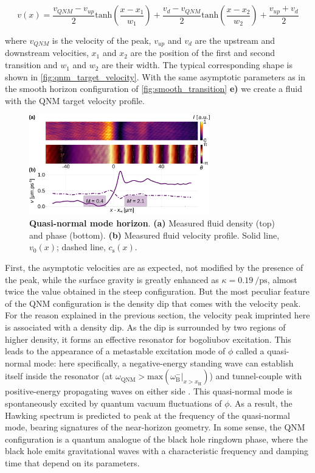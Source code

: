 \begin{equation}
    v(x)= \frac{v_{QNM}-v_{up}}{2}\mathrm{tanh}(\frac{x-x_1}{w_1})+ \frac{v_{d}-v_{QNM}}{2}\mathrm{tanh}(\frac{x-x_2}{w_2})+\frac{v_{up}+v_{d}}{2}
    \label{eq:target_velocity_qnm}
\end{equation}

where $v_{QNM}$ is the velocity of the peak, $v_{up}$ and $v_{d}$ are the upstream and downstream velocities, $x_1$ and $x_2$ are the position of the first and second transition and $w_1$ and $w_2$ are their width.
The typical corresponding shape is shown in \autoref{fig:qnm_target_velocity}.
With the same asymptotic parameters as in the smooth horizon configuration of \autoref{fig:smooth_transition} \textbf{e)} we create a fluid with the QNM target velocity profile.
\begin{figure}
    \centering
    \includegraphics[width=0.7\textwidth]{chap_custom_st/fig/bh_qnm.pdf}
    \caption{\textbf{Quasi-normal mode horizon}.    
    \textbf{(a)} Measured fluid density (top) and phase (bottom).
    \textbf{(b)} Measured fluid velocity profile.
    Solid line, $v_0(x)$; dashed line, $c_\mathrm{s}(x)$.}
    \label{fig:bh_qnm}
\end{figure}

First, the asymptotic velocities are as expected, not modified by the presence of the peak, while the surface gravity 
is greatly enhanced as $\kappa = \SI{0.19}{\per \pico \second}$, almost twice the value obtained in the steep configuration.
But the most peculiar feature of the QNM configuration is the density dip that comes with the velocity peak. For the reason explained in the previous section,
the velocity peak imprinted here is associated with a density dip. As the dip is surrounded by two regions of higher density, it forms an effective resonator for bogoliubov excitation.
This leads to the appearance of a metastable excitation mode of $\phi$ called a quasi-normal mode: here specifically, a negative-energy standing wave can establish itself inside the resonator (at $\omega_\mathrm{QNM}>\mathrm{max}(\omega_\mathrm{B}^-|_{x>x_\mathrm{H}})$) and tunnel-couple with positive-energy propagating waves on either side \cite{jacquet_quantum_2023}.
This quasi-normal mode is spontaneously excited by quantum vacuum fluctuations of $\phi$.
As a result, the Hawking spectrum is predicted to peak at the frequency of the quasi-normal mode, bearing signatures of the near-horizon geometry. 
In some sense, the QNM configuration is a quantum analogue of the black hole ringdown phase, where the black hole emits gravitational waves with a characteristic frequency and damping time \cite{brito_gravitational_2015} that depend on its parameters. 


